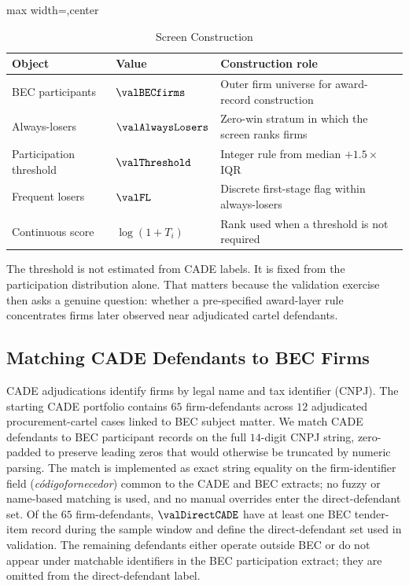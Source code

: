 \begin{table}[htbp]
\centering
\caption{Screen Construction}
\label{tab:screen_construction_app_v18}
\footnotesize
\begin{adjustbox}{max width=\textwidth,center}
\begin{tabular}{p{4.0cm}p{3.0cm}p{6.5cm}}
\toprule
Object & Value & Construction role \\
\midrule
BEC participants & $\valBECfirms$ & Outer firm universe for award-record construction \\
Always-losers & $\valAlwaysLosers$ & Zero-win stratum in which the screen ranks firms \\
Participation threshold & $\valThreshold$ & Integer rule from median $+1.5\times$IQR \\
Frequent losers & $\valFL$ & Discrete first-stage flag within always-losers \\
Continuous score & $\log(1+T_i)$ & Rank used when a threshold is not required \\
\bottomrule
\end{tabular}
\end{adjustbox}
\end{table}

The threshold is not estimated from CADE labels. It is fixed from
the participation distribution alone. That matters because the
validation exercise then asks a genuine question: whether a
pre-specified award-layer rule concentrates firms later observed
near adjudicated cartel defendants.

\subsection{Matching CADE Defendants to BEC Firms}
\label{app:cade_matching_v18}

CADE adjudications identify firms by legal name and tax
identifier (CNPJ). The starting CADE portfolio contains $65$
firm-defendants across $12$ adjudicated procurement-cartel
cases linked to BEC subject matter. We match CADE defendants
to BEC participant records on the full $14$-digit CNPJ string,
zero-padded to preserve leading zeros that would otherwise be
truncated by numeric parsing. The match is implemented as exact
string equality on the firm-identifier field
(\emph{c\'odigofornecedor}) common to the CADE and BEC extracts;
no fuzzy or name-based matching is used, and no manual
overrides enter the direct-defendant set. Of the $65$
firm-defendants, $\valDirectCADE$ have at least one BEC
tender-item record during the sample window and define the
direct-defendant set used in validation. The remaining
defendants either operate outside BEC or do not appear under
matchable identifiers in the BEC participation extract; they are
omitted from the direct-defendant label.

